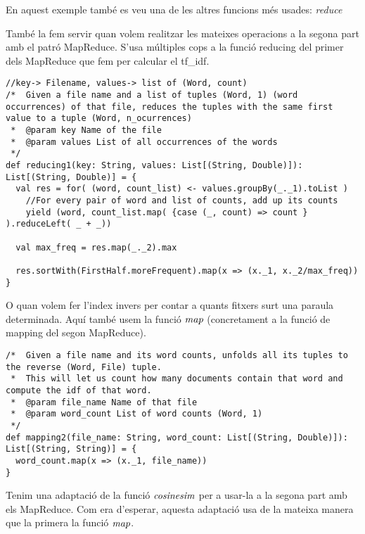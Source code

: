 \documentclass{report}
\begin{document}
En aquest exemple també es veu una de les altres funcions més usades: \emph{ reduce }

\newpage

També la fem servir quan volem realitzar les mateixes operacions a la segona part amb el patró MapReduce. S'usa múltiples cops a la funció reducing del primer dels MapReduce que fem per calcular el tf\_idf.

\begin{lstlisting}[style=scalaHighlight]
//key-> Filename, values-> list of (Word, count)
/* 	Given a file name and a list of tuples (Word, 1) (word occurrences) of that file, reduces the tuples with the same first value to a tuple (Word, n_ocurrences)
 * 	@param key Name of the file
 * 	@param values List of all occurrences of the words
 */
def reducing1(key: String, values: List[(String, Double)]): List[(String, Double)] = {
  val res = for( (word, count_list) <- values.groupBy(_._1).toList )
    //For every pair of word and list of counts, add up its counts
    yield (word, count_list.map( {case (_, count) => count } ).reduceLeft( _ + _))

  val max_freq = res.map(_._2).max

  res.sortWith(FirstHalf.moreFrequent).map(x => (x._1, x._2/max_freq))
}
\end{lstlisting}

O quan volem fer l'index invers per contar a quants fitxers surt una paraula determinada. Aquí també usem la funció $ \emph{map}$ (concretament a la funció de mapping del segon MapReduce).

\begin{lstlisting}[style=scalaHighlight]
/*	Given a file name and its word counts, unfolds all its tuples to the reverse (Word, File) tuple.
 * 	This will let us count how many documents contain that word and compute the idf of that word.
 * 	@param file_name Name of that file
 * 	@param word_count List of word counts (Word, 1)
 */
def mapping2(file_name: String, word_count: List[(String, Double)]): List[(String, String)] = {
  word_count.map(x => (x._1, file_name))
}
\end{lstlisting}

\newpage

Tenim una adaptació de la funció $ \emph{cosinesim} $ per a usar-la a la segona part amb els MapReduce. Com era d'esperar, aquesta adaptació usa de la mateixa manera que la primera la funció $ \emph{map} $.
\end{document}
